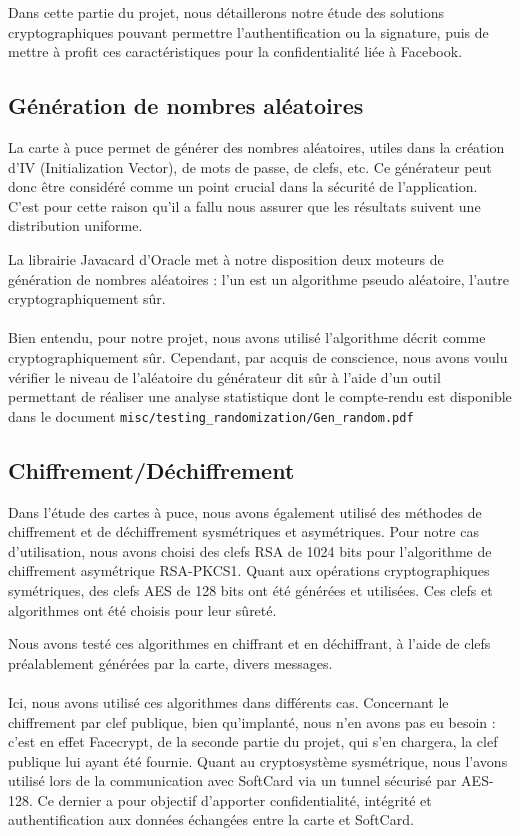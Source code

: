 \documentclass[a4paper,11pt,french]{article}
\begin{document}
Dans cette partie du projet, nous détaillerons notre étude des solutions 
cryptographiques pouvant permettre l'authentification ou la signature, puis de 
mettre à profit ces caractéristiques pour la confidentialité liée à Facebook.


\subsection{Génération de nombres aléatoires}
La carte à puce permet de générer des nombres aléatoires, utiles dans la création
d'IV (Initialization Vector), de mots de passe, de clefs, etc. Ce générateur 
peut donc être considéré comme un point crucial dans la sécurité de l'application.
C'est pour cette raison qu'il a fallu nous assurer que les résultats suivent une
distribution uniforme. 

La librairie Javacard d'Oracle met à notre disposition deux moteurs de génération
de nombres aléatoires : l'un est un algorithme pseudo aléatoire, l'autre 
cryptographiquement sûr.

\paragraph{}
Bien entendu, pour notre projet, nous avons utilisé l'algorithme décrit comme 
\og{}cryptographiquement sûr\fg{}. Cependant, par acquis de conscience, nous avons voulu
vérifier le niveau de l'aléatoire du générateur dit sûr à l'aide d'un
outil permettant de réaliser une analyse statistique dont le compte-rendu
est disponible dans le document 
\texttt{misc/testing\_randomization/Gen\_random.pdf}

\subsection{Chiffrement/Déchiffrement}
Dans l'étude des cartes à puce, nous avons également utilisé des méthodes de 
chiffrement et de déchiffrement sysmétriques et asymétriques. Pour notre cas 
d'utilisation, nous avons choisi des clefs RSA de 1024 bits pour l'algorithme de
chiffrement asymétrique RSA-PKCS1. Quant aux opérations cryptographiques 
symétriques, des clefs AES de 128 bits ont été générées et utilisées. Ces clefs
et algorithmes ont été choisis pour leur sûreté.

Nous avons testé ces algorithmes en chiffrant et en déchiffrant, à l'aide de 
clefs préalablement générées par la carte, divers messages. 

\paragraph{}
Ici, nous avons utilisé ces algorithmes dans différents cas. Concernant
le chiffrement par clef publique, bien qu'implanté, nous n'en avons pas eu 
besoin : c'est en effet Facecrypt, de la seconde partie du projet, qui s'en 
chargera, la clef publique lui ayant été fournie. Quant au cryptosystème 
sysmétrique, nous l'avons utilisé lors de la communication avec SoftCard
via un \og{}tunnel \fg{} sécurisé par AES-128. Ce dernier a pour objectif d'apporter 
confidentialité, intégrité et authentification aux données échangées entre la 
carte et SoftCard.
\end{document}
